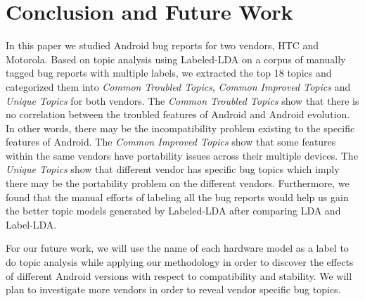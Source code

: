 \documentclass[10pt, conference, compsocconf]{IEEEtran}
\begin{document}
\section{Conclusion and Future Work}
\label{sec:conclusions}

In this paper we studied Android bug reports for two vendors, HTC and Motorola. Based on topic analysis using Labeled-LDA on a corpus of manually tagged bug reports with multiple labels, we extracted the top 18 topics and categorized them into \textit{Common Troubled Topics}, \textit{Common Improved Topics} and \textit{Unique Topics} for both vendors. The \textit{Common Troubled Topics} show that there is no correlation between the troubled features of Android and Android evolution. In other words, there may be the incompatibility problem existing to the specific features of Android. The \textit{Common Improved Topics} show that some features within the same vendors have portability issues across their multiple devices. The \textit{Unique Topics} show that different vendor has specific bug topics which imply there may be the portability problem on the different vendors. Furthermore, we found that the manual efforts of labeling all the bug reports would help us gain the better topic models generated by Labeled-LDA after comparing LDA and Label-LDA. 

For our future work, we will use the name of each hardware model as a label to do topic analysis while applying our methodology in order to discover the effects of different Android versions with respect to compatibility and stability. We will plan to investigate more vendors in order to reveal vendor specific bug topics.

\end{document}
